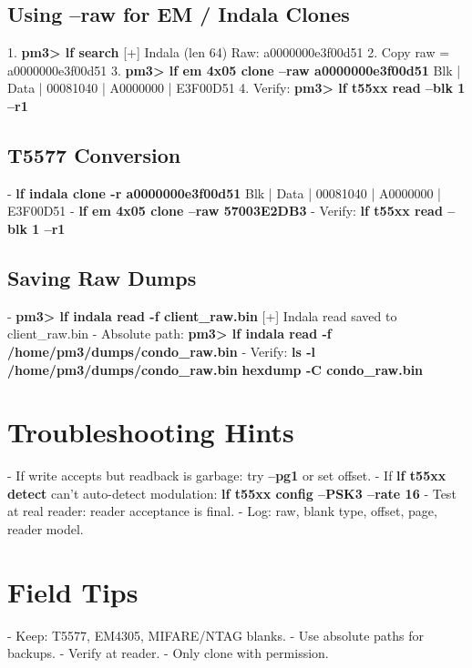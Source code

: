 \documentclass[a4paper,12pt]{article}
\begin{document}
\subsection*{Using --raw for EM / Indala Clones}
1. \textbf{pm3> lf search} \large{[+] Indala (len 64) Raw: a0000000e3f00d51}
2. Copy raw = a0000000e3f00d51
3. \textbf{pm3> lf em 4x05 clone --raw a0000000e3f00d51} \large{Blk | Data  | 00081040  | A0000000  | E3F00D51}
4. Verify: \textbf{pm3> lf t55xx read --blk 1 --r1}

\subsection*{T5577 Conversion}
- \textbf{lf indala clone -r a0000000e3f00d51} \large{Blk | Data  | 00081040  | A0000000  | E3F00D51}
- \textbf{lf em 4x05 clone --raw 57003E2DB3}
- Verify: \textbf{lf t55xx read --blk 1 --r1}

\subsection*{Saving Raw Dumps}
- \textbf{pm3> lf indala read -f client_raw.bin} \large{[+] Indala read saved to client_raw.bin}
- Absolute path: \textbf{pm3> lf indala read -f /home/pm3/dumps/condo_raw.bin}
- Verify: \textbf{ls -l /home/pm3/dumps/condo_raw.bin} \newline \textbf{hexdump -C condo_raw.bin}

\section*{Troubleshooting Hints}
- If write accepts but readback is garbage: try \textbf{--pg1} or set offset.
- If \textbf{lf t55xx detect} can't auto-detect modulation: \textbf{lf t55xx config --PSK3 --rate 16}
- Test at real reader: reader acceptance is final.
- Log: raw, blank type, offset, page, reader model.

\section*{Field Tips}
- Keep: T5577, EM4305, MIFARE/NTAG blanks.
- Use absolute paths for backups.
- Verify at reader.
- Only clone with permission.
\end{document}
